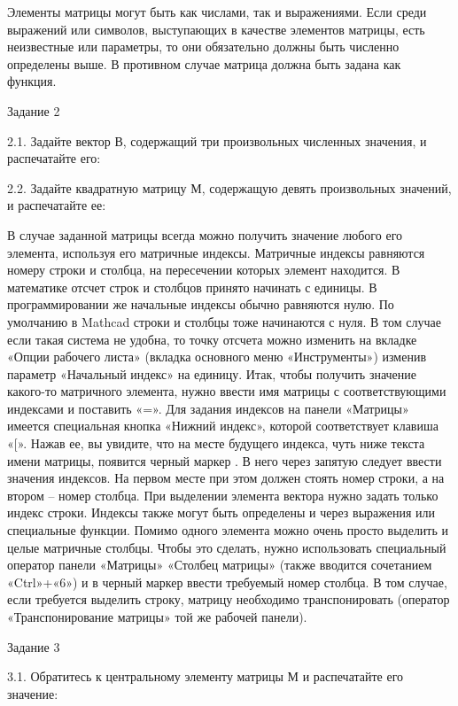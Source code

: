 Элементы матрицы могут быть как числами, так и выражениями. Если среди выражений или символов, выступающих в качестве элементов матрицы, есть неизвестные или параметры, то они обязательно должны быть численно определены выше. В противном случае матрица должна быть задана как функция.




Задание 2

2.1. Задайте вектор В, содержащий три произвольных численных значения, и распечатайте его:



2.2. Задайте квадратную матрицу М, содержащую девять произвольных значений, и распечатайте ее:



В случае заданной матрицы всегда можно получить значение любого его элемента, используя его матричные индексы. Матричные индексы равняются номеру строки и столбца, на пересечении которых элемент находится. В математике отсчет строк и столбцов принято начинать с единицы. В программировании же начальные индексы обычно равняются нулю. По умолчанию в Mathcad строки и столбцы тоже начинаются с нуля. В том случае если такая система не удобна, то точку отсчета можно изменить на вкладке «Опции рабочего листа» (вкладка основного меню «Инструменты») изменив параметр «Начальный индекс» на единицу.
Итак, чтобы получить значение какого-то матричного элемента, нужно ввести имя матрицы с соответствующими индексами и поставить «=». Для задания индексов на панели «Матрицы» имеется специальная кнопка «Нижний индекс», которой соответствует клавиша «[». Нажав ее, вы увидите, что на месте будущего индекса, чуть ниже текста имени матрицы, появится черный маркер . В него через запятую следует ввести значения индексов. На первом месте при этом должен стоять номер строки, а на втором – номер столбца. При выделении элемента вектора нужно задать только индекс строки. Индексы также могут быть определены и через выражения или специальные функции.
Помимо одного элемента можно очень просто выделить и целые матричные столбцы. Чтобы это сделать, нужно использовать специальный оператор панели «Матрицы» «Столбец матрицы» (также вводится сочетанием «Ctrl»+«6»)  и в черный маркер ввести требуемый номер столбца. В том случае, если требуется выделить строку, матрицу необходимо транспонировать (оператор «Транспонирование матрицы» той же рабочей панели).

Задание 3

3.1. Обратитесь к центральному элементу матрицы М и распечатайте его значение:



